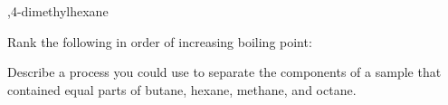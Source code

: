 \documentclass[10pt]{exam}
\begin{document}
\begin{questions}

,4-dimethylhexane

\question Rank the following in order of increasing boiling point:

\question Describe a process you could use to separate the components
of a sample that contained equal parts of butane, hexane, methane, and
octane.


\end{questions}
\end{document}
